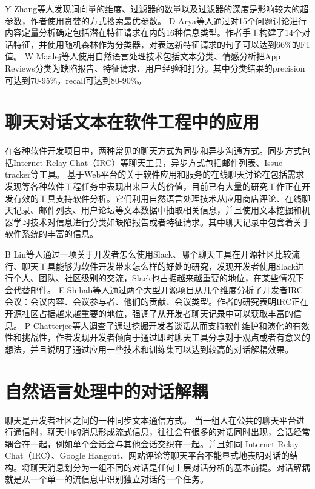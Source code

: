 Y Zhang等人\cite{zhang2015sensitivity}发现词向量的维度、过滤器的数量以及过滤器的深度是影响较大的超参数，作者使用贪婪的方式搜索最优参数。
D Arya等人\cite{arya2019analysis}通过对15个问题讨论进行内容定量分析确定包括潜在特征请求在内的16种信息类型。作者手工构建了14个对话特征，并使用随机森林作为分类器，对表达新特征请求的句子可以达到66\%的F1值。
W Maalej等人\cite{maalej2015bug}使用自然语言处理技术包括文本分类、情感分析把App Reviews分类为缺陷报告、特征请求、用户经验和打分。其中分类结果的precision可达到70-95\%，recall可达到80-90\%。
\section{聊天对话文本在软件工程中的应用}
在各种软件开发项目中，两种常见的聊天方式为同步和异步沟通方式\cite{yu2011communications}。同步方式包括Internet Relay Chat（IRC）等聊天工具，异步方式包括邮件列表、Issue tracker等工具。
基于Web平台的关于软件应用和服务的在线聊天讨论在包括需求发现等各种软件工程任务中表现出来巨大的价值\cite{Morales2019Speech}，目前已有大量的研究工作正在开发有效的工具支持软件分析。它们利用自然语言处理技术从应用商店评论、在线聊天记录、邮件列表、用户论坛等文本数据中抽取相关信息，并且使用文本挖掘和机器学习技术对信息进行分类如缺陷报告或者特征请求。其中聊天记录中包含着关于软件系统的丰富的信息。

B Lin等人\cite{lin2016developers}通过一项关于开发者怎么使用Slack、哪个聊天工具在开源社区比较流行、聊天工具能够为软件开发带来怎么样的好处的研究，发现开发者使用Slack进行个人、团队、社区级别的交流，Slack也占据越来越重要的地位，在某些情况下会代替邮件。
E Shihab等人\cite{shihab2009studying}通过两个大型开源项目从几个维度分析了开发者IRC会议：会议内容、会议参与者、他们的贡献、会议类型。作者的研究表明IRC正在开源社区占据越来越重要的地位，强调了从开发者聊天记录中可以获取丰富的信息。
P Chatterjee等人\cite{chatterjee2019exploratory}调查了通过挖掘开发者谈话从而支持软件维护和演化的有效性和挑战性，作者发现开发者倾向于通过即时聊天工具分享对于观点或者有意义的想法，并且说明了通过应用一些技术和训练集可以达到较高的对话解耦效果。

\section{自然语言处理中的对话解耦}
聊天是开发者社区之间的一种同步文本通信方式。
当一组人在公共的聊天平台进行通信时，聊天中的消息形成流式信息，往往会有很多的对话同时出现，会话经常耦合在一起，例如单个会话会与其他会话交织在一起。并且如同 Internet Relay Chat（IRC）、Google Hangout、网站评论等聊天平台不能显式地表明对话的结构。将聊天消息划分为一组不同的对话是任何上层对话分析的基本前提。对话解耦就是从一个单一的流信息中识别独立对话的一个任务。

